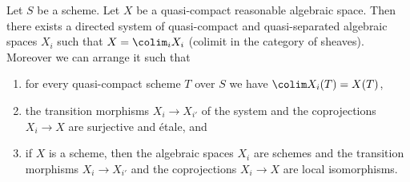 \begin{lemma}
\label{lemma-fun-property-reasonable}
Let $S$ be a scheme.
Let $X$ be a quasi-compact reasonable algebraic space.
Then there exists a directed system of quasi-compact and quasi-separated
algebraic spaces $X_i$ such that $X = \colim_i X_i$
(colimit in the category of sheaves). Moreover we can arrange it such that
\begin{enumerate}
\item for every quasi-compact scheme $T$ over $S$ we have
$\colim X_i(T) = X(T)$,
\item the transition morphisms $X_i \to X_{i'}$ of the system
and the coprojections $X_i \to X$ are surjective and \'etale, and
\item if $X$ is a scheme, then the algebraic spaces $X_i$ are schemes
and the transition morphisms $X_i \to X_{i'}$
and the coprojections $X_i \to X$ are local isomorphisms.
\end{enumerate}
\end{lemma}

